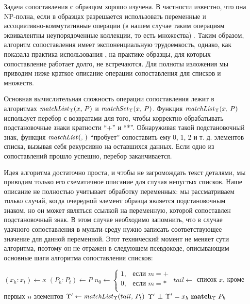 Задача сопоставления с образцом хорошо изучена. В частности известно, что она NP-полна, если в образцах разрешается использовать переменные и ассоциативно-коммутативные операции (в нашем случае таким операциям эквивалентны неупорядоченные коллекции, то есть множества) \cite{???}. Таким образом, алгоритм сопоставления имеет экспоненциальную трудоемкость, однако, как показала практика использования \GRM{}, на практике образцы, для которых сопоставление работает долго, не встречаются. Для полноты изложения мы приводим ниже краткое описание операции сопоставления для списков и множеств.

Основная вычислительная сложность операции сопоставления лежит в алгоритмах $\matchList{\ME}{x}{P}$ и $\matchSet{\ME}{x}{P}$. Функция $\matchList{\ME}{x}{P}$ использует перебор с возвратами для того, чтобы корректно обрабатывать подстановочные знаки кратности ``+'' и ``*''. 
Обнаруживая такой подстановочный знак, функция $\matchList{}{}{}$ ``пробует'' сопоставить ему 0, 1, 2 и т. д. элементов списка, вызывая себя рекурсивно на оставшихся данных. Если одно из сопоставлений прошло успешно, перебор заканчивается. 

Идея алгоритма достаточно проста, и чтобы не загромождать текст деталями, мы приводим только его схематичное описание для случая непустых списков. Наше описание не полностью учитывает обработку переменных: мы рассматриваем только случай, когда очередной элемент образца является подстановочным знаком, но он может являться ссылкой на переменную, которой сопоставлен подстановочный знак. В этом случае необходимо запомнить, что в случае удачного сопоставления в мульти-среду нужно записать соответствующее значение для данной переменной. Этот технический момент не меняет сути алгоритма, поэтому он не отражен в следующем псевдокоде, описывающим основные шаги алгоритма сопоставления списков:

\begin{algorithmic}
\STATE $(x_h : x_t) \gets x$ 
\STATE $(P_h : P_t) \gets P$
	\STATE $n_0 \gets \left\{\begin{array}{ll}
			1,&\mbox{если }m = +\\
			0,&\mbox{если }m = *\\
			\end{array}\right.$
		\STATE $tail \gets$ список $x$, кроме первых $n$ элементов
		\STATE $\ME' \gets \matchList{\ME}{tail}{P_t}$
			\RETURN $\ME'$
		\ENDIF
	\ENDFOR
	\RETURN $\bot$
\ELSE
	\STATE $\ME' = \match[\ME]{x_h}{P_h}$
\ENDIF
\end{algorithmic}

